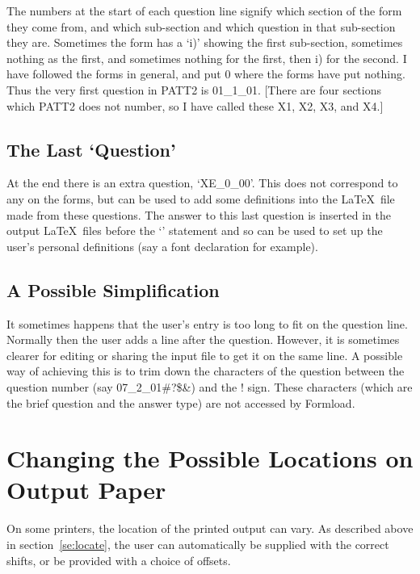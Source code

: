 The numbers at the start of each question line signify which section of the
form they come from, and which sub-section and which question in that
sub-section they are. Sometimes the form has a `i)' showing the first
sub-section, sometimes nothing as the first, and sometimes nothing for the
first, then i) for the second. I have followed the forms in general, and
put 0 where the forms have put nothing. Thus the very first question in
PATT2 is 01\_1\_01. [There are four sections which PATT2 does not number,
so I have called these X1, X2, X3, and X4.] 

\subsection{The Last `Question'}

At the end there is an extra question, `XE\_0\_00'. This does not
correspond to any on the forms, but can be used to add some definitions
into the \LaTeX\ file made from these questions. The answer to this last
question is inserted in the output \LaTeX\ files before the
`\verb++' statement and so can be used to set up the user's
personal definitions (say a font declaration for example). 

\subsection{A Possible Simplification}

It sometimes happens that the user's entry is too long to fit on the
question line. Normally then the user adds a line after the question.
However, it is sometimes clearer for editing or sharing the input file to
get it on the same line. A possible way of achieving this is to trim down
the characters of the question between the question number (say
07\_2\_01\#?\$\&) and the ! sign. These characters (which are the brief
question and the answer type) are not accessed by Formload. 



\section{Changing the Possible Locations on Output Paper}
\label{se:offset}

On some printers, the location of the printed output can vary. As described
above in section~\ref{se:locate}, the user can automatically be supplied
with the correct shifts, or be provided with a choice of offsets. 

